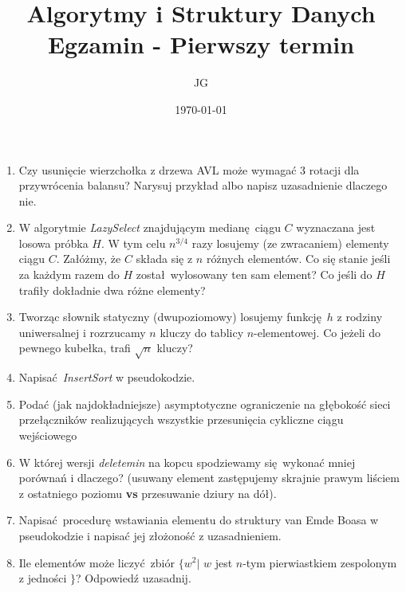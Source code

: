 \documentclass[12pt]{article}
\begin{document}
\begin{titlepage}

\title{\bfseries Algorytmy i Struktury Danych\\\Large Egzamin - Pierwszy termin}
\date{\today}
\author{JG}
\end{titlepage}

\maketitle

\begin{enumerate}

    \item{Czy usunięcie wierzchołka z drzewa AVL może wymagać 3 rotacji
    dla przywrócenia balansu? Narysuj przykład albo napisz uzasadnienie
    dlaczego nie.}
    
    \item{W algorytmie \textit{LazySelect} znajdującym medianę ciągu $C$
    wyznaczana jest losowa próbka $H$. W tym celu $n^{3/4}$ razy losujemy (ze zwracaniem)
    elementy ciągu $C$. Załóżmy, że $C$ składa się z $n$ różnych elementów. Co się
    stanie jeśli za każdym razem do $H$ został wylosowany ten sam element?
    Co jeśli do $H$ trafiły dokładnie dwa różne elementy?}
    
    \item{Tworząc słownik statyczny (dwupoziomowy) losujemy funkcję $h$ z
    rodziny uniwersalnej i rozrzucamy $n$ kluczy do tablicy $n$-elementowej. Co jeżeli 
    do pewnego kubełka, trafi $\sqrt{n}$ kluczy?}
    
    \item{Napisać \textit{InsertSort} w pseudokodzie.}
    
    \item{Podać (jak najdokładniejsze) asymptotyczne ograniczenie na głębokość sieci
        przełączników realizujących wszystkie przesunięcia cykliczne ciągu wejściowego}

    \item{W której wersji \textit{deletemin} na kopcu spodziewamy się wykonać
    mniej porównań i dlaczego? (usuwany element zastępujemy skrajnie prawym liściem
    z ostatniego poziomu \textbf{vs} przesuwanie dziury na dół).}

    \item{Napisać procedurę wstawiania elementu do struktury van Emde Boasa w 
    pseudokodzie i napisać jej złożoność z uzasadnieniem.}

    \item{Ile elementów może liczyć zbiór $\{w^2 | \,\,w$ jest 
    $n$-tym pierwiastkiem zespolonym z jedności $\}$}? Odpowiedź uzasadnij.


\end{enumerate}
\end{document}
